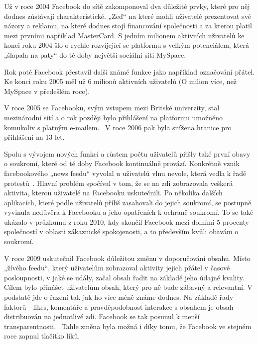     Už v roce 2004 Facebook do sítě zakomponoval dva důležité prvky, které pro něj dodnes zůstávají charakteristické. „Zeď“ na které mohli uživatelé prezentovat své názory a reklamu, na které dodnes stojí financování společnosti a za kterou platil mezi prvními například MasterCard. S jedním milionem aktivních uživatelů ke konci roku 2004 šlo o rychle rozvíjející se platformu s velkým potenciálem, která „šlapala na paty“ do té doby největší sociální síti MySpace.~\citep{Hall_2021} 
    
    
    Rok poté Facebook přestavil další známé funkce jako například označování přátel. Ke konci roku 2005 měl už 6 milionů aktivních uživatelů (O milion více, než MySpace v předešlém roce).~\citep{Hall_2021}
    
    
    V roce 2005 se Facebooku, svým vstupem mezi Britské univerzity, stal mezinárodní sítí a o rok později bylo přihlášení na platformu umožněno komukoliv s platným e-mailem.~\citep{phillips_2007} V roce 2006 pak byla snížena hranice pro přihlášení na 13 let.~\citep{andrewgreiner_fiegerman_sherman_baker_2019}
    
    Spolu s vývojem nových funkcí a růstem počtu uživatelů přišly také první obavy o soukromí, které od té doby Facebook kontinuálně provází. Konkrétně vznik facebookového „news feedu“ vyvolal u uživatelů vlnu nevole, která vedla k řadě protestů~\citep{andrewgreiner_fiegerman_sherman_baker_2019}. Hlavní problém spočíval v tom, že se na zdi zobrazovala veškerá aktivita, kterou uživatelé na Facebooku uskutečnili. Po několika dalších aplikacích, které podle uživatelů příliš zasahovali do jejich soukromí, se postupně vyvinula nedůvěra k Facebooku a jeho opatřeních k ochraně soukromí. To se také ukázalo v průzkumu z roku 2010, kdy skončil Facebook mezi dolními 5 procenty společností v oblasti zákaznické spokojenosti, a to především kvůli obavám o soukromí.~\citep{Hall_2021}
    
    V roce 2009 uskutečnil Facebook důležitou změnu v doporučování obsahu. Místo „žívého feedu“, který uživatelům zobrazoval aktivity jejich přátel v časové posloupnosti, v jaké se udály, začal obsah řadit na základě jeho údajné kvality. Cílem bylo přinášet uživatelům obsah, který pro ně bude zábavný a relevantní. V podstatě jde o řazení tak jak ho více méně známe dodnes. Na základě řady faktorů - likes, komentáře a pravděpodobnost interakce s obsahem je obsah distribuován na jednotlivé zdi. Facebook se tak posunul k menší transparentnosti.~\citep{bunz_2009} Tahle změna byla možná i díky tomu, že Facebook ve stejném roce zapnul tlačítko liků.~\citep{andrewgreiner_fiegerman_sherman_baker_2019} 
    

